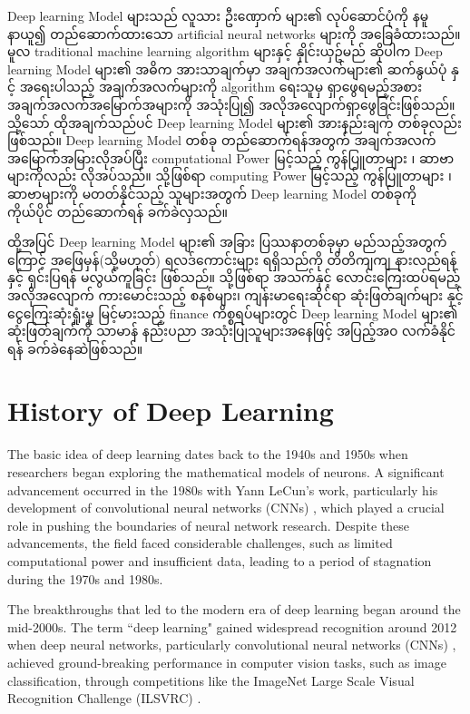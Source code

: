 Deep learning Model များသည် လူသား ဦးဏှောက် များ၏ လုပ်ဆောင်ပုံကို နမူနာယူ၍ တည်ဆောက်ထားသော  artificial neural networks များကို အခြေခံထားသည်။ မူလ traditional machine learning algorithm များနှင့် နှိုင်းယှဥ်မည် ဆိုပါက Deep learning Model များ၏ အဓိက အားသာချက်မှာ အချက်အလက်များ၏ ဆက်နွယ်ပုံ နှင့် အရေးပါသည့် အချက်အလက်များကို algorithm ရေးသူမှ ရှာဖွေရမည့်အစား  အချက်အလက်အမြောက်အများကို အသုံးပြု၍ အလိုအလျောက်ရှာဖွေခြင်းဖြစ်သည်။ သို့သော် ထိုအချက်သည်ပင် Deep learning Model များ၏ အားနည်းချက် တစ်ခုလည်း ဖြစ်သည်။ Deep learning Model တစ်ခု တည်ဆောက်ရန်အတွက် အချက်အလက် အမြောက်အမြားလိုအပ်ပြီး computational Power မြင့်သည့် ကွန်ပြူတာများ ၊ ဆာဗာများကိုလည်း လိုအပ်သည်။ သို့ဖြစ်ရာ computing Power မြင့်သည့် ကွန်ပြူတာများ ၊ ဆာဗာများကို မတတ်နိုင်သည့် သူများအတွက် Deep learning Model တစ်ခုကို ကိုယ်ပိုင် တည်ဆောက်ရန် ခက်ခဲလှသည်။

ထို့အပြင် Deep learning Model များ၏ အခြား ပြဿနာတစ်ခုမှာ မည်သည့်အတွက်ကြောင့် အဖြေမှန်(သို့မဟုတ်) ရလဒ်ကောင်းများ ရရှိသည်ကို တိတိကျကျ နားလည်ရန် နှင့် ရှင်းပြရန် မလွယ်ကူခြင်း ဖြစ်သည်။ သို့ဖြစ်ရာ  အသက်နှင့် လောင်းကြေးထပ်ရမည့် အလိုအလျောက် ကားမောင်းသည့် စနစ်များ၊ ကျန်းမာရေးဆိုင်ရာ ဆုံးဖြတ်ချက်များ နှင့် ငွေကြေးဆုံးရှုံးမှု မြင့်မားသည့် finance ကိစ္စရပ်များတွင် Deep learning Model များ၏ ဆုံးဖြတ်ချက်ကို သာမာန် နည်းပညာ အသုံးပြုသူများအနေဖြင့် အပြည့်အ၀ လက်ခံနိုင်ရန် ခက်ခဲနေဆဲဖြစ်သည်။


\section{History of Deep Learning}
\label{sec:history}
The basic idea of deep learning dates back to the 1940s and 1950s when researchers began exploring the mathematical models of neurons. A significant advancement occurred in the 1980s with Yann LeCun's work, particularly his development of convolutional neural networks (CNNs) \cite{lecun1989}, which played a crucial role in pushing the boundaries of neural network research. Despite these advancements, the field faced considerable challenges, such as limited computational power and insufficient data, leading to a period of stagnation during the 1970s and 1980s.

The breakthroughs that led to the modern era of deep learning began around the mid-2000s. The term ``deep learning" gained widespread recognition around 2012 when deep neural networks, particularly convolutional neural networks (CNNs)  \cite{krizhevsky2012ImageNet}, achieved ground-breaking performance in computer vision tasks, such as image classification, through competitions like the ImageNet Large Scale Visual Recognition Challenge (ILSVRC) \cite{web:ILSVRC}.

